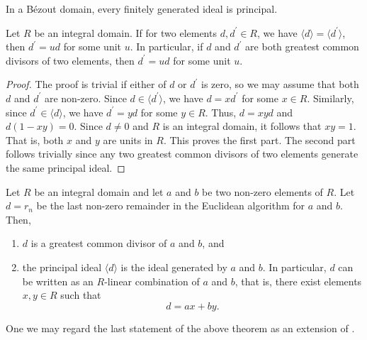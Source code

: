 \begin{exe}
    In a Bézout domain, every finitely generated ideal is principal.
\end{exe}

\begin{prop}
    Let $R$ be an integral domain. If for two elements $d, d^{\prime} \in R$, we have $\langle d \rangle = \langle d^{\prime} \rangle$, then $d^{\prime} = ud$ for some unit $u$. In particular, if $d$ and $d^{\prime}$ are both greatest common divisors of two elements, then $d^{\prime} = ud$ for some unit $u$.
\end{prop}
\begin{proof}
    The proof is trivial if either of $d$ or $d^{\prime}$ is zero, so we may assume that both $d$ and $d^{\prime}$ are non-zero. Since $d \in \langle d^{\prime} \rangle$, we have $d = xd^{\prime}$ for some $x \in R$. Similarly, since $d^{\prime} \in \langle d \rangle$, we have $d^{\prime} = yd$ for some $y \in R$. Thus, $d = xyd$ and $d(1-xy) = 0$. Since $d \neq 0$ and $R$ is an integral domain, it follows that $xy = 1$. That is, both $x$ and $y$ are units in $R$. This proves the first part. The second part follows trivially since any two greatest common divisors of two elements generate the same principal ideal.
\end{proof}

\begin{theorem}
    Let $R$ be an integral domain and let $a$ and $b$ be two non-zero elements of $R$. Let $d = r_n$ be the last non-zero remainder in the Euclidean algorithm for $a$ and $b$. Then,
    \begin{enumerate}
        \item $d$ is a greatest common divisor of $a$ and $b$, and
        \item the principal ideal $\langle d \rangle$ is the ideal generated by $a$ and $b$. In particular, $d$ can be written as an $R$-linear combination of $a$ and $b$, that is, there exist elements $x,y \in R$ such that 
        \[
            d = ax + by.
        \]
    \end{enumerate}
\end{theorem}
One we may regard the last statement of the above theorem as an extension of .


